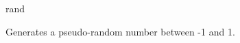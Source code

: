 \begin{math-function}{rand}

	Generates a pseudo-random number between -1 and 1.

\begin{codeexample}[post=\tt\footnotesize\pgfmathresult]
\end{codeexample}

\begin{codeexample}[post=\tt\footnotesize\pgfmathresult]
\end{codeexample}

\end{math-function}

\endgroup